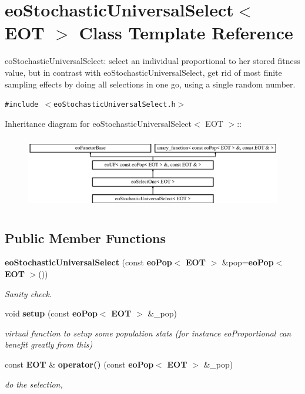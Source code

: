 \section{eo\-Stochastic\-Universal\-Select$<$ EOT $>$ Class Template Reference}
\label{classeo_stochastic_universal_select}
eo\-Stochastic\-Universal\-Select: select an individual proportional to her stored fitness value, but in contrast with eo\-Stochastic\-Universal\-Select, get rid of most finite sampling effects by doing all selections in one go, using a single random number.  


{\tt \#include $<$eo\-Stochastic\-Universal\-Select.h$>$}

Inheritance diagram for eo\-Stochastic\-Universal\-Select$<$ EOT $>$::\begin{figure}[H]
\begin{center}
\leavevmode
\includegraphics[height=3.23699cm]{classeo_stochastic_universal_select}
\end{center}
\end{figure}
\subsection*{Public Member Functions}
\begin{CompactItemize}
\item 
{\bf eo\-Stochastic\-Universal\-Select} (const {\bf eo\-Pop}$<$ {\bf EOT} $>$ \&pop={\bf eo\-Pop}$<$ {\bf EOT} $>$())\label{classeo_stochastic_universal_select_a0}

\begin{CompactList}\small\item\em Sanity check. \item\end{CompactList}\item 
void {\bf setup} (const {\bf eo\-Pop}$<$ {\bf EOT} $>$ \&\_\-pop)\label{classeo_stochastic_universal_select_a1}

\begin{CompactList}\small\item\em virtual function to setup some population stats (for instance eo\-Proportional can benefit greatly from this) \item\end{CompactList}\item 
const {\bf EOT} \& {\bf operator()} (const {\bf eo\-Pop}$<$ {\bf EOT} $>$ \&\_\-pop)\label{classeo_stochastic_universal_select_a2}

\begin{CompactList}\small\item\em do the selection, \item\end{CompactList}\end{CompactItemize}
